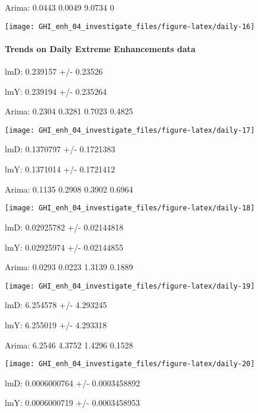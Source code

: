 \documentclass[
  10pt,
  a4paper,oneside]{article}
\begin{document}
Arima: 0.0443 0.0049 9.0734 0

\begin{center}\texttt{[image: GHI\_enh\_04\_investigate\_files/figure-latex/daily-16]} \end{center}

\newpage

\hypertarget{trends-on-daily-extreme-enhancements-data}{%
\paragraph{Trends on Daily Extreme Enhancements data}\label{trends-on-daily-extreme-enhancements-data}}

lmD: 0.239157 +/- 0.23526

lmY: 0.239194 +/- 0.235264

Arima: 0.2304 0.3281 0.7023 0.4825

\begin{center}\texttt{[image: GHI\_enh\_04\_investigate\_files/figure-latex/daily-17]} \end{center}

lmD: 0.1370797 +/- 0.1721383

lmY: 0.1371014 +/- 0.1721412

Arima: 0.1135 0.2908 0.3902 0.6964

\begin{center}\texttt{[image: GHI\_enh\_04\_investigate\_files/figure-latex/daily-18]} \end{center}

lmD: 0.02925782 +/- 0.02144818

lmY: 0.02925974 +/- 0.02144855

Arima: 0.0293 0.0223 1.3139 0.1889

\begin{center}\texttt{[image: GHI\_enh\_04\_investigate\_files/figure-latex/daily-19]} \end{center}

lmD: 6.254578 +/- 4.293245

lmY: 6.255019 +/- 4.293318

Arima: 6.2546 4.3752 1.4296 0.1528

\begin{center}\texttt{[image: GHI\_enh\_04\_investigate\_files/figure-latex/daily-20]} \end{center}

lmD: 0.0006000764 +/- 0.0003458892

lmY: 0.0006000719 +/- 0.0003458953
\end{document}
